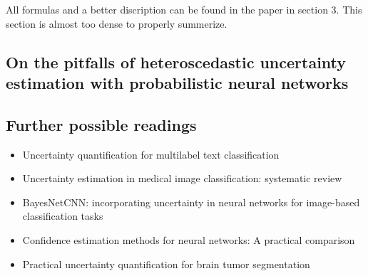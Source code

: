 \documentclass[10pt]{article}
\begin{document}
All formulas and a better discription can be found in the paper in section 3. This section is almost too dense to properly summerize.

\subsection*{On the pitfalls of heteroscedastic uncertainty estimation with probabilistic neural networks \cite{seitzer2022pitfalls}}



\subsection*{Further possible readings}
\begin{itemize}
    \item Uncertainty quantification for multilabel text classification \cite{chen2020uncertainty}
    \item Uncertainty estimation in medical image classification: systematic review \cite{kurz2022uncertainty}
    \item BayesNetCNN: incorporating uncertainty in neural networks for image-based classification tasks \cite{ferrante2022bayesnetcnn}
    \item Confidence estimation methods for neural networks: A practical comparison \cite{papadopoulos2001confidence}
    \item Practical uncertainty quantification for brain tumor segmentation \cite{fuchs2021practical}
\end{itemize}


 

\end{document}
